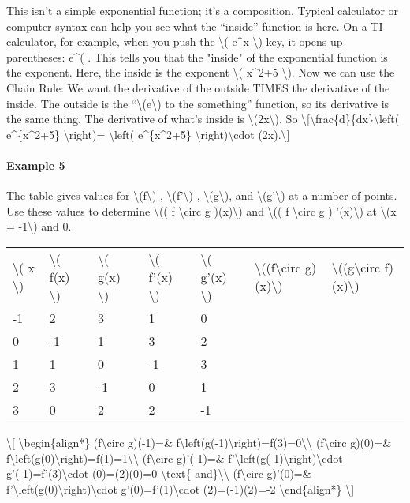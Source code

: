 This isn't a simple exponential function; it's a composition. Typical
calculator or computer syntax can help you see what the ``inside''
function is here. On a TI calculator, for example, when you push the
\textbackslash{}( e\^{}x \textbackslash{}) key, it opens up parentheses:
e\^{}( . This tells you that the "inside" of the exponential function is
the exponent. Here, the inside is the exponent \textbackslash{}(
x\^{}2+5 \textbackslash{}). Now we can use the Chain Rule: We want the
derivative of the outside TIMES the derivative of the inside. The
outside is the ``\textbackslash{}(e\textbackslash{}) to the something''
function, so its derivative is the same thing. The derivative of what's
inside is \textbackslash{}(2x\textbackslash{}). So
\textbackslash{}{[}\textbackslash{}frac\{d\}\{dx\}\textbackslash{}left(
e\^{}\{x\^{}2+5\} \textbackslash{}right)= \textbackslash{}left(
e\^{}\{x\^{}2+5\} \textbackslash{}right)\textbackslash{}cdot
(2x).\textbackslash{}{]}

\hypertarget{example-5}{%
\paragraph{Example 5}\label{example-5}}

The table gives values for \textbackslash{}(f\textbackslash{}) ,
\textbackslash{}(f'\textbackslash{}) ,
\textbackslash{}(g\textbackslash{}), and
\textbackslash{}(g'\textbackslash{}) at a number of points. Use these
values to determine \textbackslash{}(( f \textbackslash{}circ g
)(x)\textbackslash{}) and \textbackslash{}(( f \textbackslash{}circ g )
'(x)\textbackslash{}) at \textbackslash{}(x = -1\textbackslash{}) and 0.

\begin{longtable}[]{@{}lllllll@{}}
\toprule
\endhead
\textbackslash{}( x \textbackslash{}) & \textbackslash{}( f(x)
\textbackslash{}) & \textbackslash{}( g(x) \textbackslash{}) &
\textbackslash{}( f'(x) \textbackslash{}) & \textbackslash{}( g'(x)
\textbackslash{}) & \textbackslash{}((f\textbackslash{}circ
g)(x)\textbackslash{}) & \textbackslash{}((g\textbackslash{}circ
f)(x)\textbackslash{})\tabularnewline
-1 & 2 & 3 & 1 & 0 & &\tabularnewline
0 & -1 & 1 & 3 & 2 & &\tabularnewline
1 & 1 & 0 & -1 & 3 & &\tabularnewline
2 & 3 & -1 & 0 & 1 & &\tabularnewline
3 & 0 & 2 & 2 & -1 & &\tabularnewline
\bottomrule
\end{longtable}

\textbackslash{}{[} \textbackslash{}begin\{align*\}
(f\textbackslash{}circ g)(-1)=\&
f\textbackslash{}left(g(-1)\textbackslash{}right)=f(3)=0\textbackslash{}\textbackslash{}
(f\textbackslash{}circ g)(0)=\&
f\textbackslash{}left(g(0)\textbackslash{}right)=f(1)=1\textbackslash{}\textbackslash{}
(f\textbackslash{}circ g)'(-1)=\&
f'\textbackslash{}left(g(-1)\textbackslash{}right)\textbackslash{}cdot
g'(-1)=f'(3)\textbackslash{}cdot (0)=(2)(0)=0 \textbackslash{}text\{
and\}\textbackslash{}\textbackslash{} (f\textbackslash{}circ g)'(0)=\&
f'\textbackslash{}left(g(0)\textbackslash{}right)\textbackslash{}cdot
g'(0)=f'(1)\textbackslash{}cdot (2)=(-1)(2)=-2
\textbackslash{}end\{align*\} \textbackslash{}{]}

